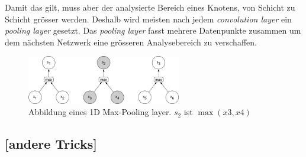 Damit das gilt, muss aber der analysierte Bereich eines Knotens, von Schicht zu Schicht grösser werden. Deshalb wird meisten nach jedem \textit{convolution layer} ein \textit{pooling layer} gesetzt. Das \textit{pooling layer} fasst mehrere Datenpunkte zusammen um dem nächsten Netzwerk eine grösseren Analysebereich zu verschaffen.
\begin{figure}[hbt]
	\centering
		\includegraphics[width=0.6\textwidth]{assets/pooling_1d.png}
	\caption{Abbildung eines 1D Max-Pooling layer. $s_2$ ist $\max (x3, x4)$}
	\label{img:pool}
\end{figure}


\subsection{[andere Tricks]}